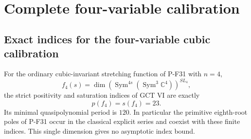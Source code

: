 \section{Complete four-variable calibration}

\subsection{Exact indices for the four-variable cubic calibration}

\begin{proposition}
\label{prop:quaternaryindices}
For the ordinary cubic-invariant stretching function of P-F31 with
$n=4$,
\[
 f_4(s)=\dim\left(\operatorname{Sym}^{4s}
                  (\operatorname{Sym}^3\mathbb C^4)\right)^{SL_4},
\]
the strict positivity and saturation indices of GCT VI are exactly
\[
                          p(f_4)=s(f_4)=23.
 \tag{P-F35a}
\]
Its minimal quasipolynomial period is $120$. In particular the
primitive eighth-root poles of P-F31 occur in the classical
explicit series and coexist with these finite indices. This
single dimension gives no asymptotic index bound.
\end{proposition}


